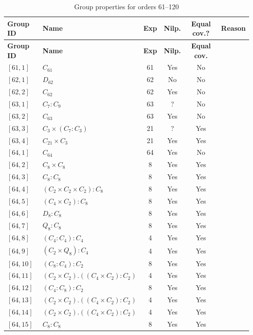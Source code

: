 \documentclass[12pt, a4paper]{article}
\theoremstyle{plain}
\theoremstyle{definition}
\begin{document}
\begin{longtable}{llcccl}
  \caption{Group properties for orders 61--120} \label{tab:groups} \\
  \toprule
  \textbf{Group ID} & \textbf{Name} & \textbf{Exp} & \textbf{Nilp.}
    & \textbf{Equal cov.?} & \textbf{Reason} \\
  \midrule
  \endfirsthead
  \toprule
  \textbf{Group ID} & \textbf{Name} & \textbf{Exp} & \textbf{Nilp.}
    & \textbf{Equal cov.}\\
  \midrule
  \endhead
  \bottomrule
  \endfoot
  \bottomrule
  \endlastfoot
  $[61,1]$ & $C_{61}$ & 61 & Yes & No \\
  $[62,1]$ & $D_{62}$ & 62 & No & No \\
  $[62,2]$ & $C_{62}$ & 62 & Yes & No \\
  $[63,1]$ & $C_7 : C_9$ & 63 & ? & No \\
  $[63,2]$ & $C_{63}$ & 63 & Yes & No \\
  $[63,3]$ & $C_3 \times (C_7 : C_3)$ & 21 & ? & Yes \\
  $[63,4]$ & $C_{21} \times C_3$ & 21 & Yes & Yes \\
  $[64,1]$ & $C_{64}$ & 64 & Yes & No \\
  $[64,2]$ & $C_8 \times C_8$ & 8 & Yes & Yes \\
  $[64,3]$ & $C_8 : C_8$ & 8 & Yes & Yes \\
  $[64,4]$ & $(C_2 \times C_2 \times C_2) : C_8$ & 8 & Yes & Yes \\
  $[64,5]$ & $(C_4 \times C_2) : C_8$ & 8 & Yes & Yes \\
  $[64,6]$ & $D_8 : C_8$ & 8 & Yes & Yes \\
  $[64,7]$ & $Q_8 : C_8$ & 8 & Yes & Yes \\
  $[64,8]$ & $(C_4 : C_4) : C_4$ & 4 & Yes & Yes \\
  $[64,9]$ & $(C_2 \times Q_8) : C_4$ & 4 & Yes & Yes \\
  $[64,10]$ & $(C_8 : C_4) : C_2$ & 8 & Yes & Yes \\
  $[64,11]$ & $(C_2 \times C_2) . ((C_4 \times C_2) : C_2)$ & 4 & Yes & Yes \\
  $[64,12]$ & $(C_4 : C_8) : C_2$ & 8 & Yes & Yes \\
  $[64,13]$ & $(C_2 \times C_2) . ((C_4 \times C_2) : C_2)$ & 4 & Yes & Yes \\
  $[64,14]$ & $(C_2 \times C_2) . ((C_4 \times C_2) : C_2)$ & 4 & Yes & Yes \\
  $[64,15]$ & $C_8 : C_8$ & 8 & Yes & Yes \\

\end{longtable}
\end{document}
